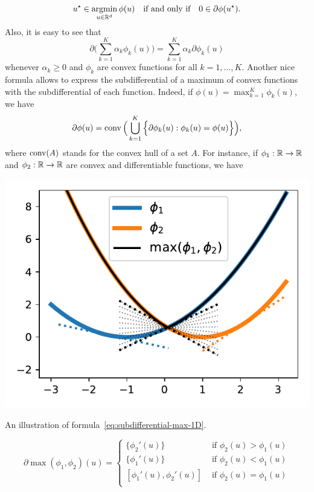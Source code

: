 \begin{equation*}
	u^\star \in \operatorname*{argmin}_{u \in \mathbb R^d} \phi(u) \quad \text{if and only if} \quad 0 \in \partial \phi(u^\star).
\end{equation*}
Also, it is easy to see that
\begin{equation*}
	\partial \Big( \sum_{k=1}^K \alpha_k \phi_k(u) \Big) = \sum_{k=1}^K \alpha_k \partial \phi_k(u)
\end{equation*}
whenever $\alpha_k \geq 0$ and $\phi_k$ are convex functions for all $k=1, \ldots, K$.
Another nice formula allows to express the subdifferential of a maximum of convex functions with the subdifferential of each function.
Indeed, if $\phi(u) = \max_{k=1}^K \phi_k(u)$, we have
\begin{equation}
	\label{eq:subdifferential-max}
	\partial \phi(u) = \operatorname{conv}\Big( \bigcup_{k=1}^K \Big\{ \partial \phi_k(u) : \phi_k(u) = \phi(u) \Big\} \Big),
\end{equation}
where $\operatorname{conv}(A)$ stands for the convex hull of a set $A$.
For instance, if $\phi_1 : \mathbb R \rightarrow \mathbb R$ and $\phi_2 : \mathbb R \rightarrow \mathbb R$ are convex and differentiable functions, we have%
\begin{marginfigure}[*-3]
	\includegraphics{assets/subdifferential-max.pdf}
	\caption{An illustration of formula~\eqref{eq:subdifferential-max-1D}.}
	\label{fig:subdifferential-max}
\end{marginfigure}
\begin{equation}
	\label{eq:subdifferential-max-1D}
	\partial \max(\phi_1, \phi_2)(u) = 
	\begin{cases}
	\{ \phi_2'(u) \} &\text{ if } \phi_2(u) > \phi_1(u) \\
	\{ \phi_1'(u) \} &\text{ if } \phi_2(u) < \phi_1(u) \\
	[ \phi_1'(u), \phi_2'(u) ] &\text{ if } \phi_2(u) = \phi_1(u) \\
	\end{cases}
\end{equation}
